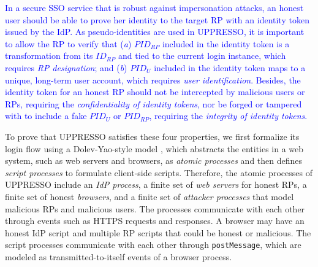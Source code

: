\textcolor{blue}{In a secure SSO service that is robust against impersonation attacks, an honest user should be able to prove her identity to the target RP with an identity token issued by the IdP. As pseudo-identities are used in UPPRESSO, it is important to allow the RP to verify that ({\em a}) $PID_{RP}$ included in the identity token is a transformation from its $ID_{RP}$ and tied to the current login instance, which requires {\em RP designation}; and ({\em b}) $PID_U$ included in the identity token maps to a unique, long-term user account, which requires {\em user identification}. Besides, the identity token for an honest RP should not be intercepted by malicious users or RPs, requiring the {\em confidentiality of identity tokens}, nor be forged or tampered with to include a fake $PID_U$ or $PID_{RP}$, requiring the {\em integrity of identity tokens}.}

To prove that UPPRESSO satisfies these four properties, we first formalize its login flow using a Dolev-Yao-style model \cite{SPRESSO}, %
which abstracts the entities in a web system, such as web servers and browsers, as \emph{atomic processes} %
and then defines \emph{script processes} to formulate client-side scripts.
Therefore, the atomic processes of UPPRESSO include an {\em IdP process}, a finite set of {\em web servers} for honest RPs, a finite set of honest {\em browsers}, and a finite set of {\em attacker processes} that model malicious RPs and malicious users. The processes communicate with each other through events such as HTTPS requests and responses. A browser may have an honest IdP script and multiple RP scripts that could be honest or malicious.
The script processes communicate with each other through \verb+postMessage+, which are modeled as transmitted-to-itself events of a browser process.

